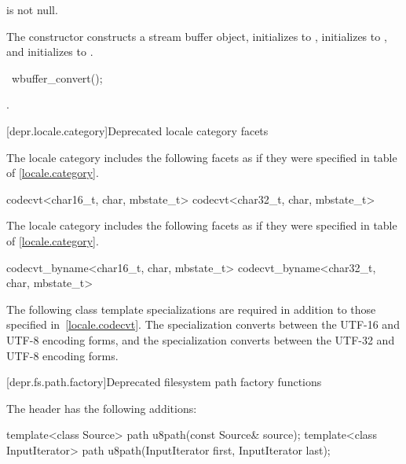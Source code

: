 \begin{itemdescr}
\pnum
\expects
{} is not null.

\pnum
\effects
The constructor constructs a stream buffer object, initializes
 to , initializes 
to , and initializes  to .
\end{itemdescr}

%
\begin{itemdecl}
~wbuffer_convert();
\end{itemdecl}

\begin{itemdescr}
\pnum
\effects
{}.
\end{itemdescr}

[depr.locale.category]{Deprecated locale category facets}

\pnum
The  locale category includes the following facets
as if they were specified
in table  of \ref{locale.category}.

\begin{codeblock}
codecvt<char16_t, char, mbstate_t>
codecvt<char32_t, char, mbstate_t>
\end{codeblock}

\pnum
The  locale category includes the following facets
as if they were specified
in table  of \ref{locale.category}.

\begin{codeblock}
codecvt_byname<char16_t, char, mbstate_t>
codecvt_byname<char32_t, char, mbstate_t>
\end{codeblock}

\pnum
The following class template specializations are required
in addition to those specified in~\ref{locale.codecvt}.
%
%
The specialization 
converts between the UTF-16 and UTF-8 encoding forms, and
%
the specialization 
converts between the UTF-32 and UTF-8 encoding forms.

[depr.fs.path.factory]{Deprecated filesystem path factory functions}

\pnum
The header  has the following additions:

%
\begin{itemdecl}
template<class Source>
  path u8path(const Source& source);
template<class InputIterator>
  path u8path(InputIterator first, InputIterator last);
\end{itemdecl}

